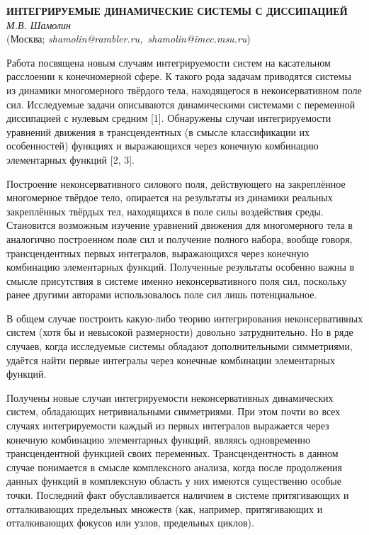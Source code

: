 \begin{center}{ \bf  ИНТЕГРИРУЕМЫЕ ДИНАМИЧЕСКИЕ СИСТЕМЫ С ДИССИПАЦИЕЙ}\\
{\it М.В. Шамолин } \\
(Москва; {\it shamolin@rambler.ru,~shamolin@imec.msu.ru})
\end{center}

Работа посвящена новым случаям интегрируемости систем на касательном
расслоении к конечномерной сфере. К такого рода задачам приводятся
системы из динамики многомерного твёрдого тела, находящегося в
неконсервативном поле сил. Исследуемые задачи описываются
динамическими системами с переменной диссипацией с нулевым средним
[1]. Обнаружены случаи интегрируемости уравнений движения в
трансцендентных (в смысле классификации их особенностей) функциях и
выражающихся через конечную комбинацию элементарных функций [2, 3].

Построение неконсервативного силового поля, действующего на
закреплённое многомерное твёрдое тело, опирается на результаты из
динамики реальных закреплённых твёрдых тел, находящихся в поле силы
воздействия среды. Становится возможным изучение уравнений движения
для многомерного тела в аналогично построенном поле сил и получение
полного набора, вообще говоря, трансцендентных первых интегралов,
выражающихся через конечную комбинацию элементарных функций.
Полученные результаты особенно важны в смысле присутствия в системе
именно неконсервативного поля сил, поскольку ранее другими авторами
использовалось поле сил лишь потенциальное.



В общем случае построить какую-либо теорию интегрирования
неконсервативных систем (хотя бы и невысокой размерности) довольно
затруднительно. Но в ряде случаев, когда исследуемые системы
обладают дополнительными симметриями, удаётся найти первые интегралы
через конечные комбинации элементарных функций.

Получены новые случаи интегрируемости неконсервативных динамических
систем, обладающих нетривиальными симметриями. При этом почти во
всех случаях интегрируемости каждый из первых интегралов выражается
через конечную комбинацию элементарных функций, являясь одновременно
трансцендентной функцией своих переменных. Трансцендентность в
данном случае понимается в смысле комплексного анализа, когда после
продолжения данных функций в комплексную область у них имеются
существенно особые точки. Последний факт обуславливается наличием в
системе притягивающих и отталкивающих предельных множеств (как,
например, притягивающих и отталкивающих фокусов или узлов,
предельных циклов).




